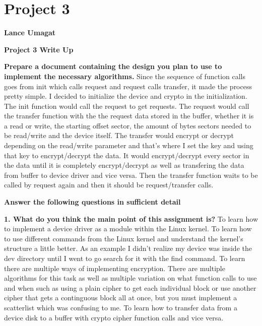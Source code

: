 \documentclass[draftclsnofoot,onecolumn,letterpaper,10pt,titlepage]{IEEEtran}
\begin{document}
\section*{Project 3}

\textbf{Lance Umagat}

\textbf{Project 3 Write Up}

\textbf{Prepare a document containing the design you plan to use to implement the necessary algorithms.}
	Since the sequence of function calls goes from init which calls request and request calls transfer, it made the process pretty simple. I decided to initialize the device and crypto in the initialization. The init function would call the request to get requests. The request would call the transfer function with the the request data stored in the buffer, whether it is a read or write, the starting offset sector, the amount of bytes sectors needed to be read/write and the device itself. The transfer would encrypt or decrypt depending on the read/write parameter and that's where I set the key and using that key to encrypt/decrypt the data. It would encrypt/decrypt every sector in the data until it is completely encrypt/decrypt as well as transfering the data from buffer to device driver and vice versa. Then the transfer function waits to be called by request again and then it should be request/transfer calls.

\textbf{Answer the following questions in sufficient detail}

    \textbf{1. What do you think the main point of this assignment is?}
     To learn how to implement a device driver as a module within the Linux kernel. To learn how to use different commands from the Linux kernel and understand the kernel's structure a little better. As an example I didn't realize my device was inside the dev directory until I went to go search for it with the find command. To learn there are multiple ways of implementing encryption. There are multiple algorithms for this task as well as multiple variation on what function calls to use and when such as using a plain cipher to get each individual block or use another cipher that gets a continguous block all at once, but you must implement a scatterlist which was confusing to me. To learn how to transfer data from a device disk to a buffer with crypto cipher function calls and vice versa.
\end{document}
